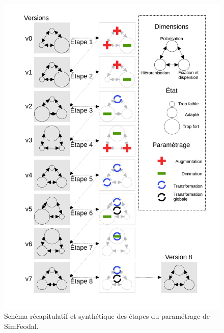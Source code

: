 \begin{figure}[H]
	\includegraphics[width = \linewidth, page = 1]{img/schema_etapes_complet.pdf}
	\caption{Schéma récapitulatif et synthétique des étapes du paramétrage de SimFeodal.}
	\label{fig:etapes-parametrage-simfeodal}
\end{figure}
	